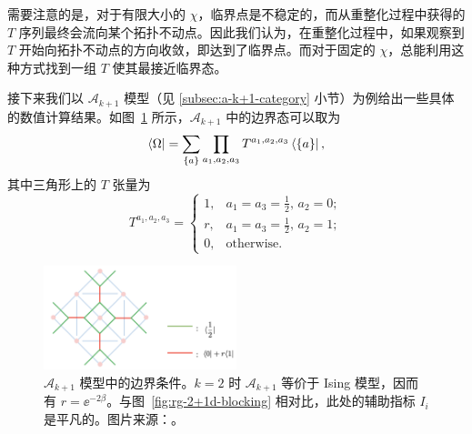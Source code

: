 需要注意的是，对于有限大小的 $\chi$，临界点是不稳定的，而从重整化过程中获得的 $T$ 序列最终会流向某个拓扑不动点。因此我们认为，在重整化过程中，如果观察到 $T$ 开始向拓扑不动点的方向收敛，即达到了临界点。而对于固定的 $\chi$，总能利用这种方式找到一组 $T$ 使其最接近临界态。

接下来我们以 $\mathcal{A}_{k+1}$ 模型（见 \ref{subsec:a-k+1-category} 小节）为例给出一些具体的数值计算结果。如图~\ref{fig:a-k+1-boundary-condition} 所示，$\mathcal{A}_{k+1}$ 中的边界态可以取为
\begin{equation}
  \bra{\Omega} = \sum_{\{a\}} \prod_{a_1, a_2, a_3} T^{a_1, a_2, a_3} \bra{\{a\}},
\end{equation}
其中三角形上的 $T$ 张量为
\begin{equation}
  T^{a_1, a_2, a_3} = \begin{cases}
    1, & a_1 = a_3 = \frac12, \, a_2 = 0; \\
    r, & a_1 = a_3 = \frac12, \, a_2 = 1; \\
    0, & \text{otherwise}.
  \end{cases}
\end{equation}

\begin{figure}[htb]
  \centering
  \includegraphics[width=0.5\textwidth]{images/holographic/a-k+1-boundary-condition.png}
  \caption[$\mathcal{A}_{k+1}$ 模型中的边界条件]{$\mathcal{A}_{k+1}$ 模型中的边界条件。$k=2$ 时 $\mathcal{A}_{k+1}$ 等价于 Ising 模型，因而有 $r=\ee^{-2\beta}$。与图~\ref{fig:rg-2+1d-blocking} 相对比，此处的辅助指标 $I_i$ 是平凡的。图片来源：\parencite{chen2022exact}。}
  \label{fig:a-k+1-boundary-condition}
\end{figure}

